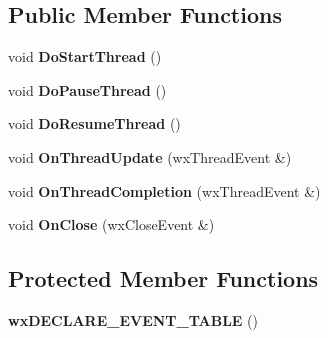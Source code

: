\subsection*{Public Member Functions}
\begin{DoxyCompactItemize}
\item 
\hypertarget{class_my_frame_a5bba78c1375f8e12e92aaa37ed09e194}{void {\bfseries Do\-Start\-Thread} ()}\label{class_my_frame_a5bba78c1375f8e12e92aaa37ed09e194}

\item 
\hypertarget{class_my_frame_aa035a8902e9c0f3ad8fd42cb881f722d}{void {\bfseries Do\-Pause\-Thread} ()}\label{class_my_frame_aa035a8902e9c0f3ad8fd42cb881f722d}

\item 
\hypertarget{class_my_frame_aac16356b13311d0cf4219843eeb54bd5}{void {\bfseries Do\-Resume\-Thread} ()}\label{class_my_frame_aac16356b13311d0cf4219843eeb54bd5}

\item 
\hypertarget{class_my_frame_a4a43a0b3f7d830aaed136acff8096cfc}{void {\bfseries On\-Thread\-Update} (wx\-Thread\-Event \&)}\label{class_my_frame_a4a43a0b3f7d830aaed136acff8096cfc}

\item 
\hypertarget{class_my_frame_a23808ee028f1eb6e7ea673d963ca9284}{void {\bfseries On\-Thread\-Completion} (wx\-Thread\-Event \&)}\label{class_my_frame_a23808ee028f1eb6e7ea673d963ca9284}

\item 
\hypertarget{class_my_frame_abbf675938c147f9ba9394c8d2df49ca8}{void {\bfseries On\-Close} (wx\-Close\-Event \&)}\label{class_my_frame_abbf675938c147f9ba9394c8d2df49ca8}

\end{DoxyCompactItemize}
\subsection*{Protected Member Functions}
\begin{DoxyCompactItemize}
\item 
\hypertarget{class_my_frame_af5512a4d5fbaddd8d2afcd3b748258fb}{{\bfseries wx\-D\-E\-C\-L\-A\-R\-E\-\_\-\-E\-V\-E\-N\-T\-\_\-\-T\-A\-B\-L\-E} ()}\label{class_my_frame_af5512a4d5fbaddd8d2afcd3b748258fb}

\end{DoxyCompactItemize}
